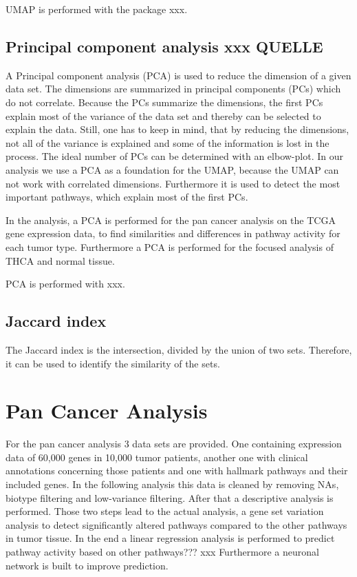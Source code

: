 \documentclass[
  parskip,
  oneside]{scrreprt}
\begin{document}
UMAP is performed with the package xxx.

\hypertarget{principal-component-analysis-xxx-quelle}{%
\subsection{Principal component analysis xxx
QUELLE}\label{principal-component-analysis-xxx-quelle}}

A Principal component analysis (PCA) is used to reduce the dimension of
a given data set. The dimensions are summarized in principal components
(PCs) which do not correlate. Because the PCs summarize the dimensions,
the first PCs explain most of the variance of the data set and thereby
can be selected to explain the data. Still, one has to keep in mind,
that by reducing the dimensions, not all of the variance is explained
and some of the information is lost in the process. The ideal number of
PCs can be determined with an elbow-plot. In our analysis we use a PCA
as a foundation for the UMAP, because the UMAP can not work with
correlated dimensions. Furthermore it is used to detect the most
important pathways, which explain most of the first PCs.

In the analysis, a PCA is performed for the pan cancer analysis on the
TCGA gene expression data, to find similarities and differences in
pathway activity for each tumor type. Furthermore a PCA is performed for
the focused analysis of THCA and normal tissue.

PCA is performed with xxx.

\hypertarget{jaccard-index}{%
\subsection{Jaccard index}\label{jaccard-index}}

The Jaccard index is the intersection, divided by the union of two sets.
Therefore, it can be used to identify the similarity of the sets.

\hypertarget{pan-cancer-analysis}{%
\section{Pan Cancer Analysis}\label{pan-cancer-analysis}}

For the pan cancer analysis 3 data sets are provided. One containing
expression data of 60,000 genes in 10,000 tumor patients, another one
with clinical annotations concerning those patients and one with
hallmark pathways and their included genes. In the following analysis
this data is cleaned by removing NAs, biotype filtering and low-variance
filtering. After that a descriptive analysis is performed. Those two
steps lead to the actual analysis, a gene set variation analysis to
detect significantly altered pathways compared to the other pathways in
tumor tissue. In the end a linear regression analysis is performed to
predict pathway activity based on other pathways??? xxx Furthermore a
neuronal network is built to improve prediction.
\end{document}
